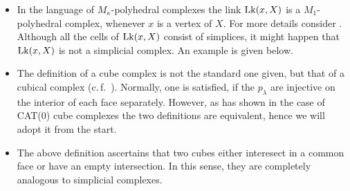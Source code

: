 \begin{rem}
  \begin{itemize}
  \item In the language of \(M_\kappa\)-polyhedral complexes the link \(\operatorname{Lk}(x, X)\) is a \(M_1\)-polyhedral complex, whenever \(x\) is a vertex of \(X\). For more details consider \textcite[Sectoin~I.7]{MR1744486}. Although all the cells of \(\operatorname{Lk}(x,X)\) consist of simplices, it might happen that \(\operatorname{Lk}(x,X)\) is not a simplicial complex. An example is given below.
  \item The definition of a cube complex is not the standard one given, but that of a cubical complex (c.\,f.~\cite[Def.~I.7.37]{MR1744486}). Normally, one is satisfied, if the \(p_\lambda\) are injective on the interior of each face separately. However, as \textcite[Thm.~C.4]{MR3029427} has shown in the case of CAT(0) cube complexes the two definitions are equivalent, hence we will adopt it from the start.
  \item The above definition ascertains that two cubes either interesect in a common face or have an empty intersection. In this sense, they are completely analogous to simplicial complexes. 
  \end{itemize}
\end{rem}

\begin{bsp}
\end{bsp}



